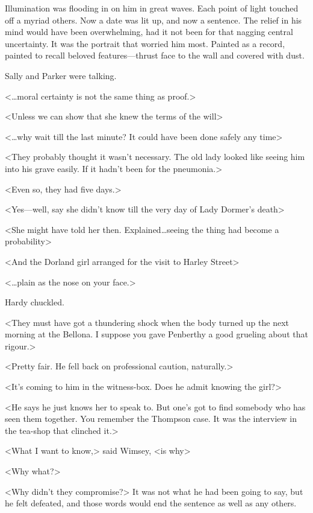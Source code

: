 Illumination was flooding in on him in great waves. Each point of light touched off a myriad others. Now a date was lit up, and now a sentence. The relief in his mind would have been overwhelming, had it not been for that nagging central uncertainty. It was the portrait that worried him most. Painted as a record, painted to recall beloved features—thrust face to the wall and covered with dust.

Sally and Parker were talking.

<\dots moral certainty is not the same thing as proof.>

<Unless we can show that she knew the terms of the will\longdots>

<\dots why wait till the last minute? It could have been done safely any time\longdots>

<They probably thought it wasn't necessary. The old lady looked like seeing him into his grave easily. If it hadn't been for the pneumonia.>

<Even so, they had five days.>

<Yes—well, say she didn't know till the very day of Lady Dormer's death\longdots>

<She might have told her then. Explained\dots  seeing the thing had become a probability\longdots>

<And the Dorland girl arranged for the visit to Harley Street\longdots>

<\dots plain as the nose on your face.>

Hardy chuckled.

<They must have got a thundering shock when the body turned up the next morning at the Bellona. I suppose you gave Penberthy a good grueling about that rigour.>

<Pretty fair. He fell back on professional caution, naturally.>

<It's coming to him in the witness-box. Does he admit knowing the girl?>

<He says he just knows her to speak to. But one's got to find somebody who has seen them together. You remember the Thompson case. It was the interview in the tea-shop that clinched it.>

<What I want to know,> said Wimsey, <is why\longdash>

<Why what?>

<Why didn't they compromise?> It was not what he had been going to say, but he felt defeated, and those words would end the sentence as well as any others.

